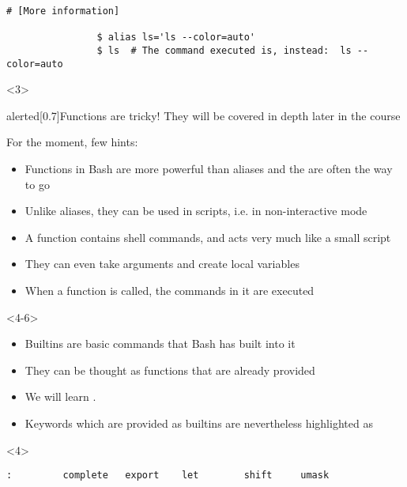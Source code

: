\begin{frame}
\begin{overlayarea}{\textwidth}{0.7\textheight}
\begin{onlyenv}
\begin{lstlisting}[style=MyBash]
                # [More information]

                $ alias ls='ls --color=auto'
                $ ls  # The command executed is, instead:  ls --color=auto
            \end{lstlisting}
        \end{onlyenv}
        \begin{onlyenv}<3>
            {\Large
            \begin{varblock}{alerted}[0.7\textwidth]{Functions are tricky!}
                They will be covered in depth later in the course
            \end{varblock}}
            \bigskip
            For the moment, few hints:
            \begin{itemize}
                \item Functions in Bash are more powerful than aliases and the are often the way to go
                \item Unlike aliases, they can be used in scripts, i.e. in non-interactive mode
                \item A function contains shell commands, and acts very much like a small script
                \item They can even take arguments and create local variables
                \item When a function is called, the commands in it are executed
            \end{itemize}
        \end{onlyenv}
        \begin{onlyenv}<4-6>
            \begin{itemize}
                \item Builtins are basic commands that Bash has built into it
                \item They can be thought as functions that are already provided
                \item We will learn .
                \item Keywords which are provided as builtins are nevertheless highlighted as 
            \end{itemize}
            \begin{onlyenv}<4>
                \begin{lstlisting}[style=MyBash, numbers=none, keywordstyle=\color{builtins-color},]
                   :         complete   export    let        shift     umask  

\end{lstlisting}
\end{onlyenv}
\end{onlyenv}
\end{overlayarea}
\end{frame}
